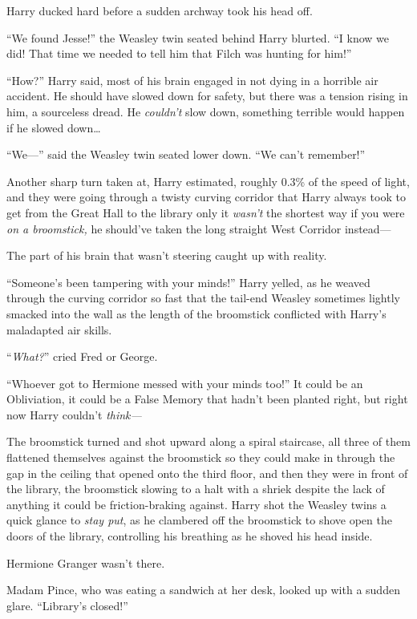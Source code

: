 Harry ducked hard before a sudden archway took his head off.

“We found Jesse!” the Weasley twin seated behind Harry blurted. “I know we did!
That time we needed to tell him that Filch was hunting for him!”

“How?” Harry said, most of his brain engaged in not dying in a horrible air
accident. He should have slowed down for safety, but there was a tension rising
in him, a sourceless dread. He \emph{couldn’t} slow down, something terrible
would happen if he slowed down…

“We—” said the Weasley twin seated lower down. “We can’t remember!”

Another sharp turn taken at, Harry estimated, roughly 0.3\% of the speed of
light, and they were going through a twisty curving corridor that Harry always
took to get from the Great Hall to the library only it \emph{wasn’t} the
shortest way if you were \emph{on a broomstick,} he should’ve taken the long
straight West Corridor instead—

The part of his brain that wasn’t steering caught up with reality.

“Someone’s been tampering with your minds!” Harry yelled, as he weaved through
the curving corridor so fast that the tail-end Weasley sometimes lightly
smacked into the wall as the length of the broomstick conflicted with Harry’s
maladapted air skills.

“\emph{What?}” cried Fred or George.

“Whoever got to Hermione messed with your minds too!” It could be an
Obliviation, it could be a False Memory that hadn’t been planted right, but
right now Harry couldn’t \emph{think—}

The broomstick turned and shot upward along a spiral staircase, all three of
them flattened themselves against the broomstick so they could make in through
the gap in the ceiling that opened onto the third floor, and then they were in
front of the library, the broomstick slowing to a halt with a shriek despite
the lack of anything it could be friction-braking against. Harry shot the
Weasley twins a quick glance to \emph{stay put}, as he clambered off the
broomstick to shove open the doors of the library, controlling his breathing as
he shoved his head inside.

Hermione Granger wasn’t there.

Madam Pince, who was eating a sandwich at her desk, looked up with a sudden
glare. “Library’s closed!”

